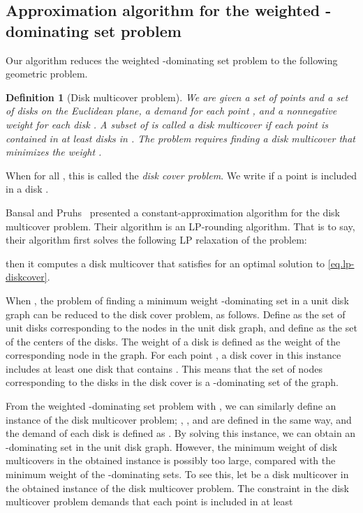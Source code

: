 \documentclass[11pt]{article}
\newtheorem{definition}{Definition}
\begin{document}
\subsection{Approximation algorithm for the weighted  -dominating set problem}
\label{subs.dominating}

Our algorithm reduces the weighted -dominating set problem to the following
geometric problem.

  
 \begin{definition}[Disk multicover problem]
 We are given a set  of points and a set  of disks on the
 Euclidean plane,
  a demand  for each point ,
 and a nonnegative weight  for each disk .
  A subset  of 
is called a disk multicover if
 each point  is contained in at least  disks in .
  The problem requires finding a disk multicover  that minimizes the weight .
  \end{definition}

When  for all , this is called the
\emph{disk cover problem}.
We write  if a point  is included in a disk .

Bansal and Pruhs~\cite{Bansal:2012ik} presented a constant-approximation algorithm for the disk
multicover problem.
Their algorithm is an LP-rounding algorithm. That is to say, their
algorithm first solves the following LP relaxation of the problem:

then it computes a disk multicover  
that satisfies  for an optimal solution  to \eqref{eq.lp-diskcover}.

When , the problem of finding a minimum weight -dominating set
in a unit disk graph
can be reduced to the disk cover problem, as follows.
Define  as the set of unit disks corresponding to the nodes in the
unit disk graph, and define  as the set of the centers of the disks.
The weight  of a disk  is defined as the weight of the
corresponding node in the graph.
For each point ,
a disk cover in this instance includes at least one disk
that contains . 
This means that the set of nodes corresponding to the disks in the 
disk cover
is a -dominating set of the graph.

From the weighted -dominating set problem with ,
we can similarly define an instance of the disk multicover problem;
, , and  are defined in the same way,
and the demand  of each disk  is defined as .
By solving this instance, we can obtain
an -dominating set in the unit disk graph.
However, the minimum weight of disk multicovers in the obtained instance
is possibly too large, compared with the minimum weight of the -dominating sets.
To see this, let  be a disk multicover in the obtained instance of the
disk multicover problem.
The constraint in the disk multicover
problem demands that each point  is included in at least
\end{document}
